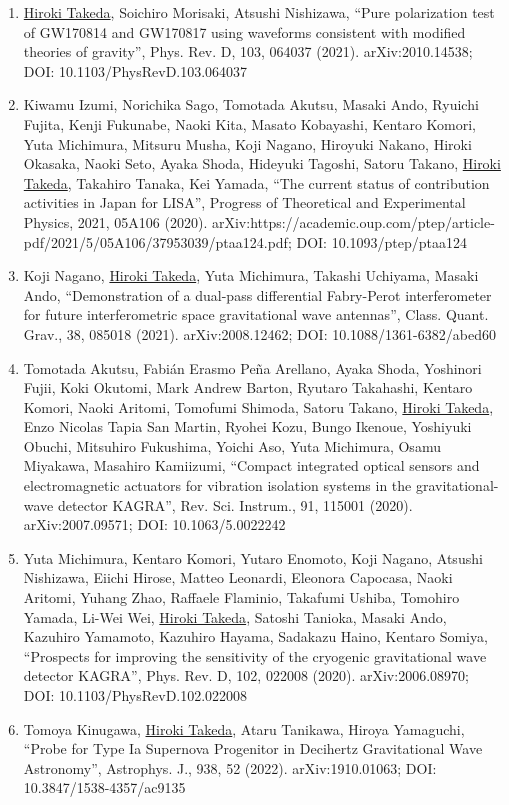 \documentclass[uplatex, 11pt]{jsarticle}
\begin{document}
\begin{enumerate}
\item \uline{Hiroki Takeda}, Soichiro Morisaki, Atsushi Nishizawa, “Pure polarization test of GW170814 and GW170817 using waveforms consistent with modified theories of gravity”, Phys. Rev. D, 103, 064037 (2021). arXiv:2010.14538; DOI: 10.1103/PhysRevD.103.064037
\item Kiwamu Izumi, Norichika Sago, Tomotada Akutsu, Masaki Ando, Ryuichi Fujita, Kenji Fukunabe, Naoki Kita, Masato Kobayashi, Kentaro Komori, Yuta Michimura, Mitsuru Musha, Koji Nagano, Hiroyuki Nakano, Hiroki Okasaka, Naoki Seto, Ayaka Shoda, Hideyuki Tagoshi, Satoru Takano, \uline{Hiroki Takeda}, Takahiro Tanaka, Kei Yamada, “The current status of contribution activities in Japan for LISA”, Progress of Theoretical and Experimental Physics, 2021, 05A106 (2020). arXiv:https://academic.oup.com/ptep/article-pdf/2021/5/05A106/37953039/ptaa124.pdf; DOI: 10.1093/ptep/ptaa124
\item Koji Nagano, \uline{Hiroki Takeda}, Yuta Michimura, Takashi Uchiyama, Masaki Ando, “Demonstration of a dual-pass differential Fabry-Perot interferometer for future interferometric space gravitational wave antennas”, Class. Quant. Grav., 38, 085018 (2021). arXiv:2008.12462; DOI: 10.1088/1361-6382/abed60
\item Tomotada Akutsu, Fabián Erasmo Peña Arellano, Ayaka Shoda, Yoshinori Fujii, Koki Okutomi, Mark Andrew Barton, Ryutaro Takahashi, Kentaro Komori, Naoki Aritomi, Tomofumi Shimoda, Satoru Takano, \uline{Hiroki Takeda}, Enzo Nicolas Tapia San Martin, Ryohei Kozu, Bungo Ikenoue, Yoshiyuki Obuchi, Mitsuhiro Fukushima, Yoichi Aso, Yuta Michimura, Osamu Miyakawa, Masahiro Kamiizumi, “Compact integrated optical sensors and electromagnetic actuators for vibration isolation systems in the gravitational-wave detector KAGRA”, Rev. Sci. Instrum., 91, 115001 (2020). arXiv:2007.09571; DOI: 10.1063/5.0022242
\item Yuta Michimura, Kentaro Komori, Yutaro Enomoto, Koji Nagano, Atsushi Nishizawa, Eiichi Hirose, Matteo Leonardi, Eleonora Capocasa, Naoki Aritomi, Yuhang Zhao, Raffaele Flaminio, Takafumi Ushiba, Tomohiro Yamada, Li-Wei Wei, \uline{Hiroki Takeda}, Satoshi Tanioka, Masaki Ando, Kazuhiro Yamamoto, Kazuhiro Hayama, Sadakazu Haino, Kentaro Somiya, “Prospects for improving the sensitivity of the cryogenic gravitational wave detector KAGRA”, Phys. Rev. D, 102, 022008 (2020). arXiv:2006.08970; DOI: 10.1103/PhysRevD.102.022008
\item Tomoya Kinugawa, \uline{Hiroki Takeda}, Ataru Tanikawa, Hiroya Yamaguchi, “Probe for Type Ia Supernova Progenitor in Decihertz Gravitational Wave Astronomy”, Astrophys. J., 938, 52 (2022). arXiv:1910.01063; DOI: 10.3847/1538-4357/ac9135

\end{enumerate}
\end{document}
